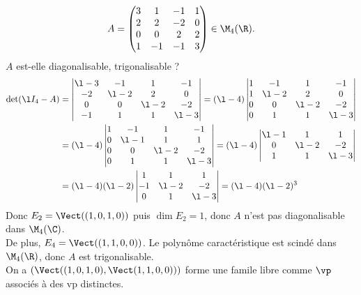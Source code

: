 \documentclass[11pt]{article}
\begin{document}
\begin{exercice}{}{}
    \begin{equation*}
        A = \begin{pmatrix}3&1&-1&1\\2&2&-2&0\\0&0&2&2\\1&-1&-1&3\end{pmatrix} \in \M_4(\R).
    \end{equation*}
    $A$ est-elle diagonalisable, trigonalisable ?
    \tcblower
    \begin{align*}
        \det(\l I_4 - A) &= \begin{vmatrix}\l-3&-1&1&-1 \\ -2 & \l-2 & 2 & 0 \\ 0 & 0 & \l-2 & -2 \\ -1 & 1 & 1 & \l-3\end{vmatrix} = (\l-4)\begin{vmatrix}1 & -1 & 1 & -1 \\ 1 & \l-2 & 2 & 0 \\ 0 & 0 & \l - 2 & -2 \\ 0 & 1 & 1 & \l-3\end{vmatrix}\\
        &= (\l-4)\begin{vmatrix}1&-1&1&-1\\0&\l-1&1&1\\0&0&\l-2&-2\\0&1&1&\l-3\end{vmatrix} = (\l-4)\begin{vmatrix}\l-1&1&1\\0&\l-2&-2\\1&1&\l-3\end{vmatrix}\\
        &= (\l-4)(\l-2)\begin{vmatrix}1&1&1\\-1&\l-2&-2\\0&1&\l-3\end{vmatrix}=(\l-4)(\l-2)^3
    \end{align*}
    Donc $E_2 = \Vect((1,0,1,0))$ puis $\dim E_2 = 1$, donc $A$ n'est pas diagonalisable dans $\M_4(\C)$.\\
    De plus, $E_4=\Vect((1,1,0,0))$. Le polynôme caractéristique est scindé dans $\M_4(\R)$, donc $A$ est trigonalisable.\\
    On a $(\Vect((1,0,1,0),\Vect(1,1,0,0)))$ forme une famile libre comme $\vp$ associés à des vp distinctes.\\

\end{exercice}
\end{document}
